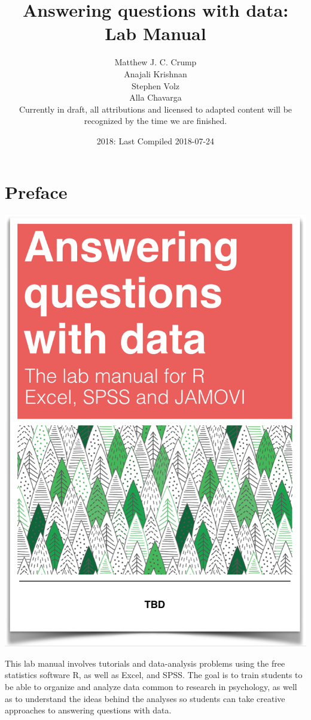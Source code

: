 \documentclass[]{book}
\title{Answering questions with data: Lab Manual}
\author{Matthew J. C. Crump \\ Anajali Krishnan \\ Stephen Volz \\ Alla Chavarga \\ Currently in draft, all attributions and licensed to adapted content
will be recognized by the time we are finished.}
\date{2018: Last Compiled 2018-07-24}
\theoremstyle{definition}
\theoremstyle{definition}
\theoremstyle{definition}
\theoremstyle{remark}
\begin{document}
\maketitle

{
\setcounter{tocdepth}{1}
\tableofcontents
}
\chapter*{Preface}\label{preface}

\begin{center}\includegraphics[width=12.5in]{LabmanualCover} \end{center}

This lab manual involves tutorials and data-analysis problems using the
free statistics software R, as well as Excel, and SPSS. The goal is to
train students to be able to organize and analyze data common to
research in psychology, as well as to understand the ideas behind the
analyses so students can take creative approaches to answering questions
with data.
\end{document}

